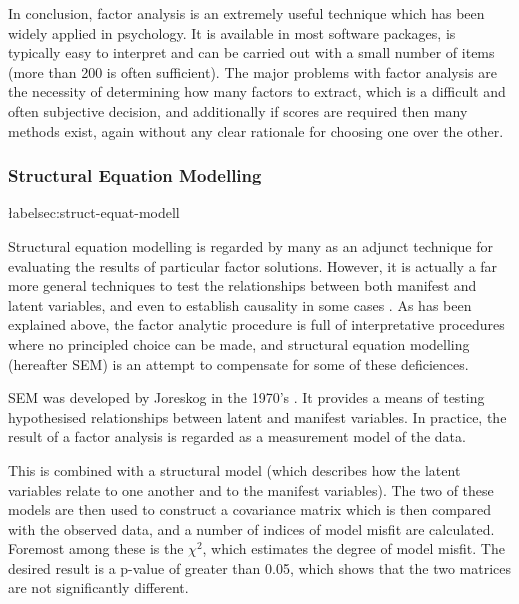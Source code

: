 In conclusion, factor analysis is an extremely useful technique which has been widely applied in psychology. It is available in most software packages, is typically easy to interpret and can be carried out with a small number of items (more than 200 is often sufficient). The major problems with factor analysis are the necessity of determining how many factors to extract, which is a difficult and often subjective decision, and additionally if scores are required then many methods exist, again without any clear rationale for choosing one over the other.  



\subsubsection{Structural Equation Modelling}
\l\label{sec:struct-equat-modell}abel{sec:struct-equat-modell}

Structural equation modelling is regarded by many as an adjunct technique for evaluating the results of particular factor solutions\cite{fabrigar1999evaluating}. However, it is actually a far more general techniques to test the relationships between both manifest and latent variables, and even to establish causality in some cases \cite{pearl1998graphs}.   As has been explained above, the factor analytic procedure is full of interpretative procedures where no principled choice can be made, and structural equation modelling (hereafter SEM) is an attempt to compensate for some of these deficiences.

SEM was developed by Joreskog in the 1970's \cite{joreskog1978structural}. It provides a means of testing hypothesised relationships between latent and manifest variables. In practice, the result of a factor analysis is regarded as a measurement model of the data.

This is combined with a structural model (which describes how the latent variables relate to one another and to the manifest variables). The two of these models are then used to construct a covariance matrix which is then compared with the observed data, and a number of indices of model misfit are calculated. Foremost among these is the $\chi^2$, which estimates the degree of model misfit. The desired result is a p-value of greater than 0.05, which shows that the two matrices are not significantly different.

